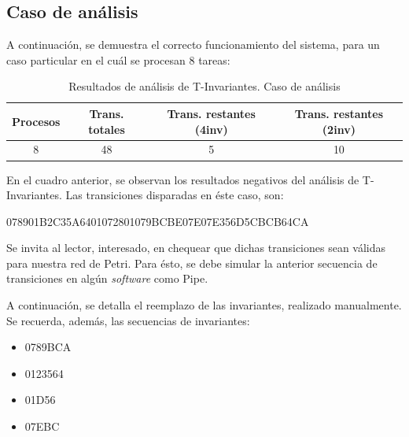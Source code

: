 \documentclass{article}
\begin{document}
    \subsection{Caso de análisis} \noindent
    A continuación, se demuestra el correcto funcionamiento del sistema, para un caso particular
    en el cuál se procesan 8 tareas:
    \begin{center}
        \begin{table}[H]
            \centering
            \begin{tabular}{||c|c|c|c||} 
                \hline
                Procesos & Trans. totales & Trans. restantes (4inv) & Trans. restantes (2inv) \\ [0.5ex] 
                \hline\hline
                8 & 48 & 5 & 10 \\ 
                \hline
            \end{tabular}
            \caption{Resultados de análisis de T-Invariantes. Caso de análisis}
        \end{table}
    \end{center} \par
    En el cuadro anterior, se observan los resultados negativos del análisis de 
    T-Invariantes. Las transiciones disparadas en éste caso, son: \newline 
    \begin{center}
        078901B2C35A6401072801079BCBE07E07E356D5CBCB64CA 
    \end{center} \par
    Se invita al lector, interesado, en chequear que dichas transiciones sean válidas para 
    nuestra red de Petri. Para ésto, se debe simular la anterior secuencia de transiciones
    en algún \emph{software} como Pipe. \newline \par
    A continuación, se detalla el reemplazo de las invariantes, realizado manualmente. 
    Se recuerda, además, las secuencias de invariantes: \par
    \begin{itemize}
        \item 0789BCA
        \item 0123564
        \item 01D56
        \item 07EBC 
    \end{itemize} \par
\end{document}
